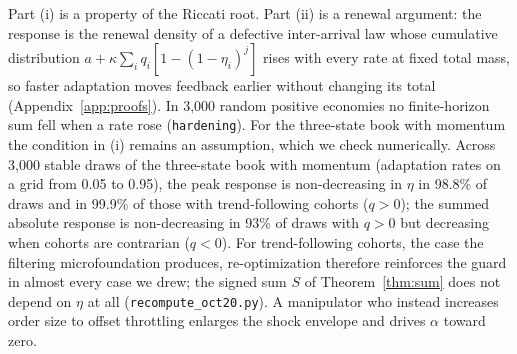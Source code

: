 Part (i) is a property of the Riccati root. Part (ii) is a renewal argument: the response is the renewal density of a defective inter-arrival law whose cumulative distribution $a+\kappa\sum_iq_i[1-(1-\eta_i)^j]$ rises with every rate at fixed total mass, so faster adaptation moves feedback earlier without changing its total (Appendix~\ref{app:proofs}). In 3{,}000 random positive economies no finite-horizon sum fell when a rate rose (\texttt{hardening}). For the three-state book with momentum the condition in (i) remains an assumption, which we check numerically. Across 3{,}000 stable draws of the three-state book with momentum (adaptation rates on a grid from 0.05 to 0.95), the peak response is non-decreasing in $\eta$ in 98.8\% of draws and in 99.9\% of those with trend-following cohorts ($q>0$); the summed absolute response is non-decreasing in 93\% of draws with $q>0$ but decreasing when cohorts are contrarian ($q<0$). For trend-following cohorts, the case the filtering microfoundation produces, re-optimization therefore reinforces the guard in almost every case we drew; the signed sum $S$ of Theorem~\ref{thm:sum} does not depend on $\eta$ at all (\texttt{recompute\_oct20.py}). A manipulator who instead increases order size to offset throttling enlarges the shock envelope and drives $\alpha$ toward zero.
